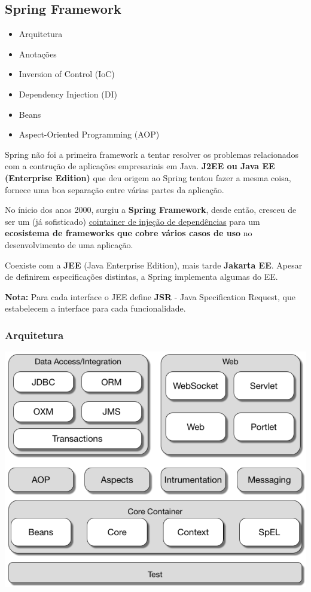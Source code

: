 \documentclass{article}
\begin{document}
\pagebreak

\subsection{Spring Framework}

\begin{itemize}
  \item Arquitetura
  \item Anotações
  \item Inversion of Control (IoC)
  \item Dependency Injection (DI)
  \item Beans
  \item Aspect-Oriented Programming (AOP)
\end{itemize}

Spring não foi a primeira framework a tentar resolver os problemas
relacionados com a contrução de aplicações empresariais em Java.
\textbf{J2EE ou Java EE (Enterprise Edition)} que deu origem
ao Spring tentou fazer a mesma coisa, fornece uma boa separação
entre várias partes da aplicação.

No ínicio dos anos 2000, surgiu a \textbf{Spring Framework},
desde então, cresceu de ser um (já sofisticado) \uline{cointainer de
injeção de dependências} para um \textbf{ecosistema de frameworks
que cobre vários casos de uso} no desenvolvimento de uma aplicação.

Coexiste com a \textbf{JEE} (Java Enterprise Edition), mais tarde \textbf{Jakarta EE}. Apesar de definirem
especificações distintas, a Spring implementa algumas do EE.

\begin{flushleft}
  \textbf{Nota:} Para cada interface o JEE define \textbf{JSR} -
  Java Specification Request, que estabelecem a interface para cada
  funcionalidade.
\end{flushleft}


\subsubsection{Arquitetura}

\begin{center}
  \includegraphics[scale=0.35]{76}
\end{center}
\end{document}
